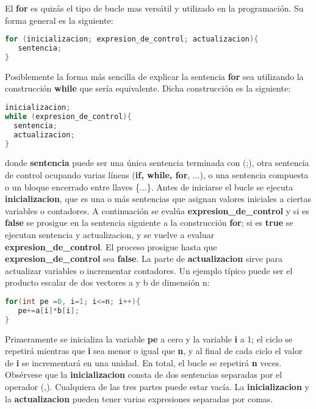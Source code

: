 El \textbf{for} es quizás el tipo de bucle mas versátil y utilizado en la programación. Su forma general es la
siguiente:

\begin{lstlisting}[language=C++]
for (inicializacion; expresion_de_control; actualizacion){
   sentencia;
}
\end{lstlisting}

Posiblemente la forma más sencilla de explicar la sentencia \textbf{for} sea utilizando
la construcción \textbf{while} que sería equivalente. Dicha construcción es la siguiente:

\begin{lstlisting}[language=C++]
inicializacion;
while (expresion_de_control){
  sentencia;
  actualizacion;
}
\end{lstlisting}

donde \textbf{sentencia} puede ser una única sentencia terminada con (;), otra sentencia de control
ocupando varias líneas (\textbf{if, while, for}, ...), o una sentencia compuesta o un bloque encerrado
entre llaves \{...\}. Antes de iniciarse el bucle se ejecuta \textbf{inicializacion}, que es una o más
sentencias que asignan valores iniciales a ciertas variables o contadores. A continuación se
evalúa \textbf{expresion\_de\_control} y si es \textbf{false} se prosigue en la sentencia siguiente a la
construcción \textbf{for}; si es \textbf{true} se ejecutan sentencia y actualizacion, y se vuelve a evaluar
\textbf{expresion\_de\_control}. El proceso prosigue hasta que \textbf{expresion\_de\_control} sea \textbf{false}. La
parte de \textbf{actualizacion} sirve para actualizar variables o incrementar contadores. Un ejemplo
típico puede ser el producto escalar de dos vectores a y b de dimensión n:

\begin{lstlisting}[language=C++]
for(int pe =0, i=1; i<=n; i++){
   pe+=a[i]*b[i];
}
\end{lstlisting}

Primeramente se inicializa la variable \textbf{pe} a cero y la variable \textbf{i} a 1; el ciclo se repetirá mientras que \textbf{i} sea menor o igual que \textbf{n}, y al final de cada ciclo el valor de \textbf{i} se incrementará en
una unidad. En total, el bucle se repetirá \textbf{n} veces. Obsérvese que la \textbf{inicializacion} consta de dos sentencias separadas por el operador (,). Cualquiera de las tres partes puede estar vacía. La
\textbf{inicializacion} y la \textbf{actualizacion} pueden tener varias expresiones separadas por comas.

